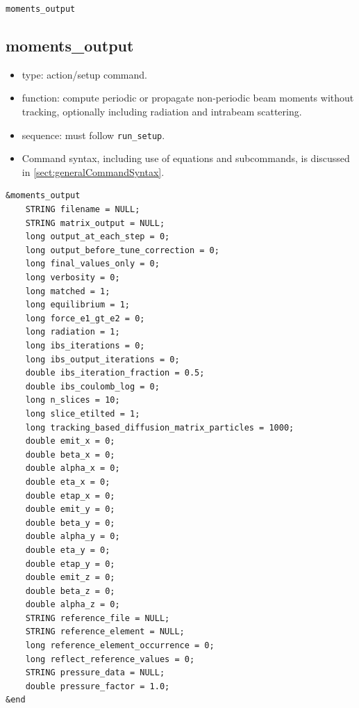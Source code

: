 \documentclass[11pt]{article}
\begin{document}
\newpage
\begin{center}{\Large\verb|moments_output|}\end{center}
\subsection{moments\_output \label{subsec:momentsoutput}}

\begin{itemize}
\item type: action/setup command.
\item function: compute periodic or propagate non-periodic beam moments without tracking, optionally including radiation
  and intrabeam scattering.
\item sequence: must follow \verb|run_setup|.
\item Command syntax, including use of equations and subcommands, is discussed in \ref{sect:generalCommandSyntax}.
\end{itemize}

\begin{verbatim}
&moments_output
    STRING filename = NULL;
    STRING matrix_output = NULL;
    long output_at_each_step = 0;
    long output_before_tune_correction = 0;
    long final_values_only = 0;
    long verbosity = 0;
    long matched = 1;
    long equilibrium = 1;
    long force_e1_gt_e2 = 0;
    long radiation = 1;
    long ibs_iterations = 0;
    long ibs_output_iterations = 0;
    double ibs_iteration_fraction = 0.5;
    double ibs_coulomb_log = 0;
    long n_slices = 10;
    long slice_etilted = 1;
    long tracking_based_diffusion_matrix_particles = 1000;
    double emit_x = 0;
    double beta_x = 0;
    double alpha_x = 0;
    double eta_x = 0;
    double etap_x = 0;
    double emit_y = 0;
    double beta_y = 0;
    double alpha_y = 0;
    double eta_y = 0;
    double etap_y = 0;
    double emit_z = 0;
    double beta_z = 0;
    double alpha_z = 0;
    STRING reference_file = NULL;
    STRING reference_element = NULL;
    long reference_element_occurrence = 0;
    long reflect_reference_values = 0;
    STRING pressure_data = NULL;
    double pressure_factor = 1.0;
&end
\end{verbatim}
\end{document}
